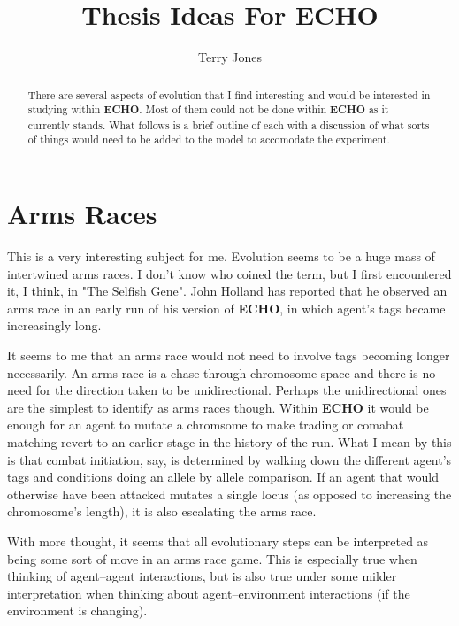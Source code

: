 

\pagestyle {empty}

\title {{\bf Thesis Ideas For ECHO}}

\author
{Terry Jones }

\maketitle

\begin{abstract}
There are several aspects of evolution that I find interesting and
would be interested in studying within {\bf ECHO}. Most of them could not
be done within {\bf ECHO} as it currently stands. What follows is a brief
outline of each with a discussion of what sorts of things would need
to be added to the model to accomodate the experiment.
\end{abstract}

\section{Arms Races}
This is a very interesting subject for me. Evolution seems to be a
huge mass of intertwined arms races. I don't know who coined the term,
but I first encountered it, I think, in "The Selfish Gene". John
Holland has reported that he observed an arms race in an early run of
his version of {\bf ECHO}, in which agent's tags became increasingly
long.

It seems to me that an arms race would not need to involve tags
becoming longer necessarily. An arms race is a chase through
chromosome space and there is no need for the direction taken to be
unidirectional. Perhaps the unidirectional ones are the simplest to
identify as arms races though. Within {\bf ECHO} it would be enough
for an agent to mutate a chromsome to make trading or comabat matching
revert to an earlier stage in the history of the run. What I mean by
this is that combat initiation, say, is determined by walking down the
different agent's tags and conditions doing an allele by allele
comparison. If an agent that would otherwise have been attacked
mutates a single locus (as opposed to increasing the chromosome's
length), it is also escalating the arms race.

With more thought, it seems that all evolutionary steps can be
interpreted as being some sort of move in an arms race game. This is
especially true when thinking of agent--agent interactions, but is
also true under some milder interpretation when thinking about
agent--environment interactions (if the environment is changing).

